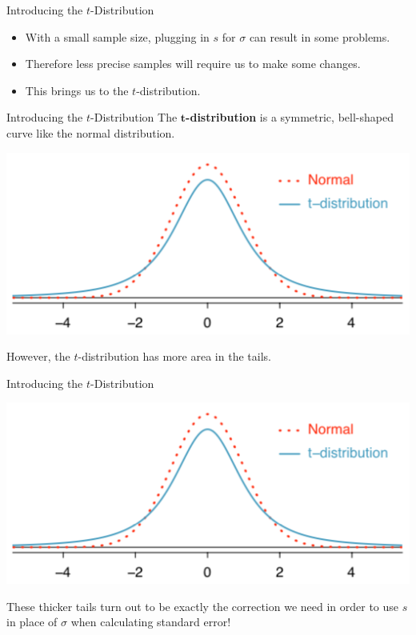 \begin{frame}{Introducing the $t$-Distribution} 
    \begin{itemize}
        \item With a small sample size, plugging in $s$ for $\sigma$ can result in some problems.
        \item Therefore less precise samples will require us to make some changes.
        \item This brings us to the $t$-distribution.
    \end{itemize}
\end{frame}

\begin{frame}{Introducing the $t$-Distribution}
    The \textbf{$\boldsymbol{t}$-distribution} is a symmetric, bell-shaped curve like the normal distribution. 
    \begin{center}
        \includegraphics[scale=0.5]{images/tvsnrml.png}
    \end{center}
    
    However, the $t$-distribution has more area in the tails.
\end{frame}

\begin{frame}{Introducing the $t$-Distribution}
    \begin{center}
        \includegraphics[scale=0.5]{images/tvsnrml.png}
    \end{center}
    
    These thicker tails turn out to be exactly the correction we need in order to use $s$ in place of $\sigma$ when calculating standard error!
\end{frame}

